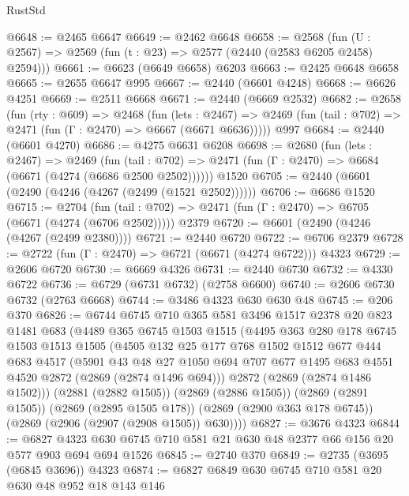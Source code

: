\begin{lexlean}{RustStd}
\begin{coremodule}
@6648 := @2465 @6647
@6649 := @2462 @6648
@6658 := @2568 (fun (U : @2567) => @2569 (fun (t : @23) => @2577 (@2440 (@2583 @6205 @2458) @2594)))
@6661 := @6623 (@6649 @6658) @6203
@6663 := @2425 @6648 @6658
@6665 := @2655 @6647 @995
@6667 := @2440 (@6601 @4248)
@6668 := @6626 @4251
@6669 := @2511 @6668
@6671 := @2440 (@6669 @2532)
@6682 := @2658
    (fun (rty : @609) =>
    @2468
      (fun (lets : @2467) =>
      @2469 (fun (tail : @702) => @2471 (fun (Γ : @2470) => @6667 (@6671 @6636)))))
    @997
@6684 := @2440 (@6601 @4270)
@6686 := @4275 @6631 @6208
@6698 := @2680
    (fun (lets : @2467) =>
    @2469
      (fun (tail : @702) => @2471 (fun (Γ : @2470) => @6684 (@6671 (@4274 (@6686 @2500 @2502))))))
    @1520
@6705 := @2440 (@6601 (@2490 (@4246 (@4267 (@2499 (@1521 @2502))))))
@6706 := @6686 @1520
@6715 := @2704
    (fun (tail : @702) => @2471 (fun (Γ : @2470) => @6705 (@6671 (@4274 (@6706 @2502)))))
    @2379
@6720 := @6601 (@2490 (@4246 (@4267 (@2499 @2380))))
@6721 := @2440 @6720
@6722 := @6706 @2379
@6728 := @2722 (fun (Γ : @2470) => @6721 (@6671 (@4274 @6722))) @4323
@6729 := @2606 @6720
@6730 := @6669 @4326
@6731 := @2440 @6730
@6732 := @4330 @6722
@6736 := @6729 (@6731 @6732) (@2758 @6600)
@6740 := @2606 @6730 @6732 (@2763 @6668)
@6744 := @3486 @4323 @630 @630 @48
@6745 := @206 @370
@6826 := @6744
    @6745
    @710
    @365
    @581
    @3496
    @1517
    @2378
    @20
    @823
    @1481
    @683
    (@4489
      @365
      @6745
      @1503
      @1515
      (@4495
        @363
        @280
        @178
        @6745
        @1503
        @1513
        @1505
        (@4505
          @132
          @25
          @177
          @768
          @1502
          @1512
          @677
          @444
          @683
          @4517
          (@5901
            @43
            @48
            @27
            @1050
            @694
            @707
            @677
            @1495
            @683
            @4551
            @4520
            @2872
            (@2869 (@2874 @1496 @694)))
          @2872
          (@2869 (@2874 @1486 @1502)))
        (@2881 (@2882 @1505))
        (@2869 (@2886 @1505))
        (@2869 (@2891 @1505))
        (@2869 (@2895 @1505 @178))
        (@2869 (@2900 @363 @178 @6745))
        (@2869 (@2906 (@2907 (@2908 @1505)) @630))))
@6827 := @3676 @4323
@6844 := @6827 @4323 @630 @6745 @710 @581 @21 @630 @48 @2377 @66 @156 @20 @577 @903 @694 @694 @1526
@6845 := @2740 @370
@6849 := @2735 (@3695 (@6845 @3696)) @4323
@6874 := @6827
    @6849
    @630
    @6745
    @710
    @581
    @20
    @630
    @48
    @952
    @18
    @143
    @146

\end{coremodule}
\end{lexlean}
